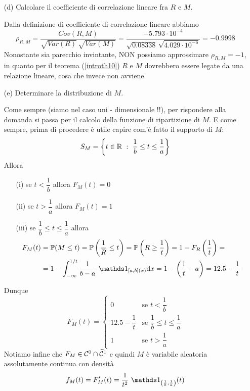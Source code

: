\begin{enumerate}
\item [(d)] Calcolare il coefficiente di correlazione lineare fra $R$ e $M$.

Dalla definizione di coefficiente di correlazione lineare abbiamo
\[
\rho_{R,M}=\frac{Cov(R,M)}{\sqrt{Var(R)}\,\sqrt{Var(M)}}=\frac{-5.793\cdot 10^{-4}}{\sqrt{0.08338}\,\sqrt{4.029\cdot 10^{-6}}}=-0.9998
\]
Nonostante sia parecchio invintante, NON possiamo approssimare $\rho_{R,M}=-1$, in quanto per il teorema (\ref{introth10}) $R$ e $M$ dovrebbero essere legate da una relazione lineare, cosa che invece non avviene.

\item [(e)] Determinare la distribuzione di $M$.

Come sempre (siamo nel caso uni - dimensionale !!), per rispondere alla domanda si passa per il calcolo della funzione di ripartizione di $M$. E come sempre, prima di procedere è utile capire com'è fatto il supporto di $M$:
\[
S_M=\left\{ t\in\mathbb{R}\ :\ \frac{1}{b}\leq t\leq\frac{1}{a}  \right\}
\]
Allora
\begin{enumerate}
\item [(i)] se $t<\dfrac{1}{b}$ allora $F_M(t)=0$

\item [(ii)] se $t>\dfrac{1}{a}$ allora $F_M(t)=1$

\item [(iii)] se $\dfrac{1}{b}\leq t\leq\dfrac{1}{a}$ allora
\begin{gather*}
\begin{aligned}
F_M(t)&=\PP(M\leq t)=\PP\left(\frac{1}{R}\leq t\right)=\PP\left(R\geq\frac{1}{t}\right)=1-F_R\left(\frac{1}{t}\right)=\\
&=1-\int_{-\infty}^{1/t}\frac{1}{b-a}\ \Ind_{[a,b](x)}\dx=1-\left(\frac{1}{t}-a\right)=12.5-\frac{1}{t}
\end{aligned}
\end{gather*}
\end{enumerate}
Dunque
\[
F_M(t)=
\begin{cases}
0                               &\text{se }t<\dfrac{1}{b} \\
12.5-\dfrac{1}{t}        &\text{se } \dfrac{1}{b}\leq t\leq \dfrac{1}{a}  \\
1                               &\text{se }t>\dfrac{1}{a}
\end{cases}
\]
Notiamo infine che $F_M\in\mathcal{C}^0\cap\widetilde{\mathcal{C}}^1$ e quindi $M$ è variabile aleatoria assolutamente continua con densità
\[
f_M(t)=F_M'(t)=\frac{1}{t^2}\ \Ind_{\left(\frac{1}{b},\frac{1}{a}\right)}(t)
\]


\end{enumerate}
